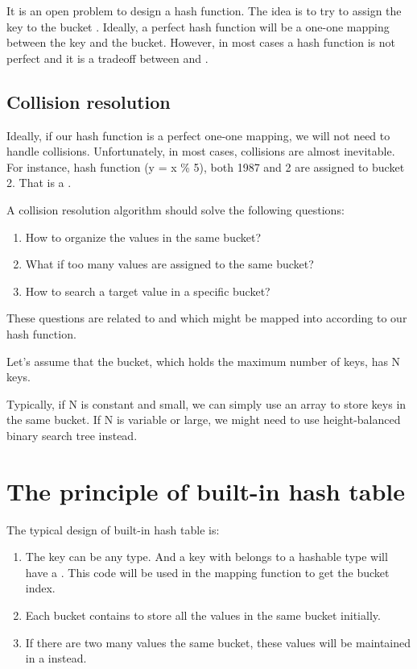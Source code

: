 It is an open problem to design a hash function.
The idea is to try to assign the key to the bucket .
Ideally, a perfect hash function will be a one-one mapping between the key and the bucket.
However, in most cases a hash function is not perfect and it is a tradeoff between  and .


\subsection{Collision resolution}

Ideally, if our hash function is a perfect one-one mapping, we will not need to handle collisions.
Unfortunately, in most cases, collisions are almost inevitable.
For instance, hash function (y = x \% 5), both 1987 and 2 are assigned to bucket 2.
That is a .


A collision resolution algorithm should solve the following questions:

\begin{enumerate}
\item How to organize the values in the same bucket?
\item What if too many values are assigned to the same bucket?
\item How to search a target value in a specific bucket?
\end{enumerate}

These questions are related to  and  which might be mapped into  according to our hash function.

Let's assume that the bucket, which holds the maximum number of keys, has N keys.

Typically, if N is constant and small, we can simply use an array to store keys in the same bucket. If N is variable or large, we might need to use height-balanced binary search tree instead.



\section{The principle of built-in hash table}

The typical design of built-in hash table is:
\begin{enumerate}
\item The key can be any  type. And a key with belongs to a hashable type will have a . This code will be used in the mapping function to get the bucket index.
\item Each bucket contains  to store all the values in the same bucket initially.
\item If there are two many values the same bucket, these values will be maintained in a  instead.
\end{enumerate}

